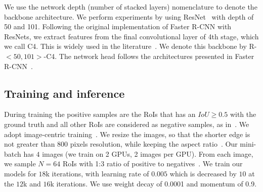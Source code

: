 We use the network depth (number of stacked layers) nomenclature to denote the backbone architecture.
We perform experiments by using ResNet~\cite{He2016deep}
with depth of 50 and 101.
Following the original implementation of Faster R-CNN with ResNets,
we extract features from the final convolutional layer of 4th stage, which we call C4.
This is widely used in the literature~\cite{He2016deep, Huang2017,Shrivastava2016skip}.
We denote this backbone by \mbox{R-$<50, 101>$-C4}.
%
The network head follows the architectures presented in Faster R-CNN~\cite{Ren2017fasterpami}.

\subsection{Training and inference}
%
During training the positive samples are the RoIs that has an $IoU \geq 0.5$ with the ground truth and all other RoIs are considered as negative samples, as in~\cite{Girshick2015}.
We adopt image-centric training~\cite{Girshick2015}.
We resize the images, so that the shorter edge is not greater than 800  pixels resolution, while keeping the aspect ratio~\cite{He2017mask}.
Our mini-batch has $4$ images (we train on 2 GPUs, 2 images per GPU).
From each image, we sample $N=64$ RoIs with 1:3 ratio of positive to negatives~\cite{Girshick2015, Ren2017fasterpami}.
We train our models for $18$k iterations, with learning rate of $0.005$ which is decreased by $10$ at the $12$k and $16$k iterations.
We use weight decay of 0.0001 and momentum of 0.9.


